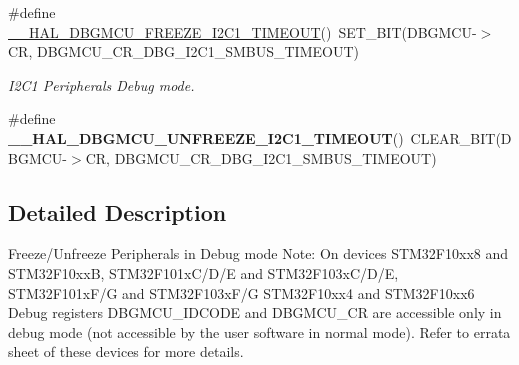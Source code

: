 \begin{DoxyCompactItemize}
\#define \hyperlink{group___d_b_g_m_c_u___freeze___unfreeze_ga6160f642dcff812be3a04c5b5c66e31d}{\+\_\+\+\_\+\+H\+A\+L\+\_\+\+D\+B\+G\+M\+C\+U\+\_\+\+F\+R\+E\+E\+Z\+E\+\_\+\+I2\+C1\+\_\+\+T\+I\+M\+E\+O\+UT}()~S\+E\+T\+\_\+\+B\+IT(D\+B\+G\+M\+CU-\/$>$CR, D\+B\+G\+M\+C\+U\+\_\+\+C\+R\+\_\+\+D\+B\+G\+\_\+\+I2\+C1\+\_\+\+S\+M\+B\+U\+S\+\_\+\+T\+I\+M\+E\+O\+UT)
\begin{DoxyCompactList}\small\item\em I2\+C1 Peripherals Debug mode. \end{DoxyCompactList}\item 
\mbox{\label{group___d_b_g_m_c_u___freeze___unfreeze_ga636083d6b6931b1cf35e7c39aebf0723}} 
\#define {\bfseries \+\_\+\+\_\+\+H\+A\+L\+\_\+\+D\+B\+G\+M\+C\+U\+\_\+\+U\+N\+F\+R\+E\+E\+Z\+E\+\_\+\+I2\+C1\+\_\+\+T\+I\+M\+E\+O\+UT}()~C\+L\+E\+A\+R\+\_\+\+B\+IT(D\+B\+G\+M\+CU-\/$>$CR, D\+B\+G\+M\+C\+U\+\_\+\+C\+R\+\_\+\+D\+B\+G\+\_\+\+I2\+C1\+\_\+\+S\+M\+B\+U\+S\+\_\+\+T\+I\+M\+E\+O\+UT)
\end{DoxyCompactItemize}


\subsection{Detailed Description}
Freeze/\+Unfreeze Peripherals in Debug mode Note\+: On devices S\+T\+M32\+F10xx8 and S\+T\+M32\+F10xxB, S\+T\+M32\+F101x\+C/\+D/E and S\+T\+M32\+F103x\+C/\+D/E, S\+T\+M32\+F101x\+F/G and S\+T\+M32\+F103x\+F/G S\+T\+M32\+F10xx4 and S\+T\+M32\+F10xx6 Debug registers D\+B\+G\+M\+C\+U\+\_\+\+I\+D\+C\+O\+DE and D\+B\+G\+M\+C\+U\+\_\+\+CR are accessible only in debug mode (not accessible by the user software in normal mode). Refer to errata sheet of these devices for more details. 

